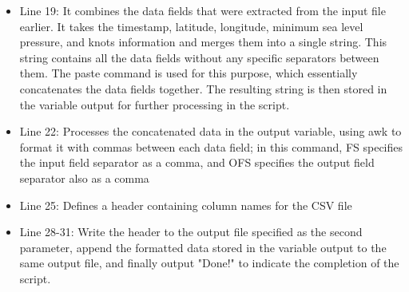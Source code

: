 \documentclass[]{article}
\begin{document}
\begin{itemize}
    \item Line 19: It combines the data fields that were extracted from the input file earlier. It takes the timestamp, latitude, longitude, minimum sea level pressure, and knots information and merges them into a single string. This string contains all the data fields without any specific separators between them. The paste command is used for this purpose, which essentially concatenates the data fields together. The resulting string is then stored in the variable output for further processing in the script.
    \item Line 22: Processes the concatenated data in the output variable, using awk to format it with commas between each data field; in this command, FS specifies the input field separator as a comma, and OFS specifies the output field separator also as a comma
    \item Line 25: Defines a header containing column names for the CSV file
    \item Line 28-31: Write the header to the output file specified as the second parameter, append the formatted data stored in the variable output to the same output file, and finally output "Done!" to indicate the completion of the script.
    
    \end{itemize}
\clearpage
\end{document}
